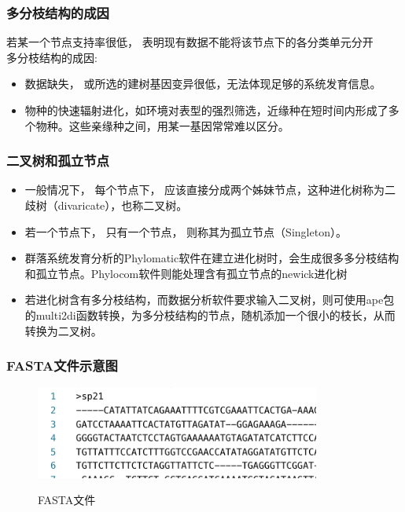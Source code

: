\documentclass[UTF8]{ctexbeamer}
\begin{document}
\begin{frame}
\frametitle{多分枝结构的成因}
若某一个节点支持率很低， 表明现有数据不能将该节点下的各分类单元分开\\
多分枝结构的成因: \\
\begin{itemize}
\item 数据缺失， 或所选的建树基因变异很低，无法体现足够的系统发育信息。\\ 
\item 物种的快速辐射进化，如环境对表型的强烈筛选，近缘种在短时间内形成了多个物种。这些亲缘种之间，用某一基因常常难以区分。\\
\end{itemize}
\end{frame}


\begin{frame}
\frametitle{二叉树和孤立节点}
\begin {itemize}
\item 一般情况下， 每个节点下， 应该直接分成两个姊妹节点，这种进化树称为二歧树（divaricate），也称二叉树。\\
\item 若一个节点下， 只有一个节点， 则称其为孤立节点（Singleton）。
\item 群落系统发育分析的Phylomatic软件在建立进化树时，会生成很多多分枝结构和孤立节点。Phylocom软件则能处理含有孤立节点的newick进化树\\
\item 若进化树含有多分枝结构，而数据分析软件要求输入二叉树，则可使用ape包的multi2di函数转换，为多分枝结构的节点，随机添加一个很小的枝长，从而转换为二叉树。
\end{itemize}
\end{frame}




\begin{frame}
\frametitle{FASTA文件示意图}
\begin{center}
\begin{figure}
\includegraphics[height=1.2in]{fasta_example.png}\\
\caption{FASTA文件}
\end{figure}
\end{center}
\end{frame}
\end{document}
